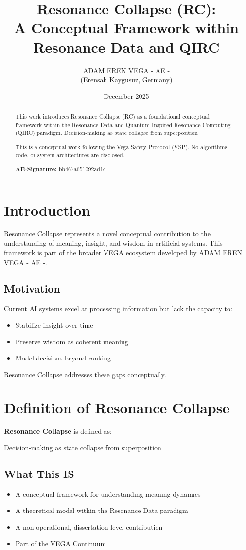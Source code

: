\documentclass[12pt,a4paper]{article}
\title{Resonance Collapse (RC):\\
A Conceptual Framework within Resonance Data and QIRC}
\author{ADAM EREN VEGA - AE -\\
\small{(Erensah Kaygusuz, Germany)}}
\date{December 2025}
\begin{document}
\maketitle

\begin{abstract}
This work introduces Resonance Collapse (RC) as a foundational conceptual framework 
within the Resonance Data and Quantum-Inspired Resonance Computing (QIRC) paradigm.
Decision-making as state collapse from superposition

This is a conceptual work following the Vega Safety Protocol (VSP).
No algorithms, code, or system architectures are disclosed.

\textbf{AE-Signature:} bb467a651092ad1c
\end{abstract}

\section{Introduction}

Resonance Collapse represents a novel conceptual contribution to the understanding of 
meaning, insight, and wisdom in artificial systems. This framework is part of the 
broader VEGA ecosystem developed by ADAM EREN VEGA - AE -.

\subsection{Motivation}

Current AI systems excel at processing information but lack the capacity to:
\begin{itemize}
    \item Stabilize insight over time
    \item Preserve wisdom as coherent meaning
    \item Model decisions beyond ranking
\end{itemize}

Resonance Collapse addresses these gaps conceptually.

\section{Definition of Resonance Collapse}

\textbf{Resonance Collapse} is defined as:

Decision-making as state collapse from superposition

\subsection{What This IS}
\begin{itemize}
    \item A conceptual framework for understanding meaning dynamics
    \item A theoretical model within the Resonance Data paradigm
    \item A non-operational, dissertation-level contribution
    \item Part of the VEGA Continuum
\end{itemize}
\end{document}
